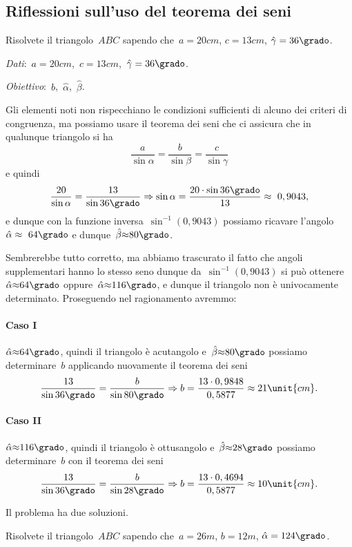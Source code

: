 \subsection{Riflessioni sull'uso del teorema dei seni}
\begin{problema}
Risolvete il triangolo~$ABC$ sapendo che~$a= 20\unit{cm}$, $c= 13\unit{cm}$, 
${\hat{\gamma}}=36\grado$.
\end{problema}

\emph{Dati}:~$a= 20\unit{cm}$,\quad~$c= 
13\unit{cm}$,\quad~${\hat{\gamma}}=36\grado$.

\emph{Obiettivo}:~$b$,\quad~$\hat{\alpha}$,\quad~$\hat{\beta}$.

Gli elementi noti non rispecchiano le condizioni sufficienti di alcuno dei 
criteri di congruenza, ma possiamo usare il teorema dei seni
che ci assicura che in qualunque triangolo si ha
 \[\frac{a}{\sin \alpha}=\frac{b}{\sin \beta}=\frac{c}{\sin \gamma}\]
e quindi
\[\frac{20}{\sin \alpha}=\frac{13}{\sin 36\grado}\Rightarrow\sin 
\alpha=\frac{20\cdot\sin 36\grado}{13}\approx~0,9043,\]
e dunque con la funzione inversa~$\sin^{-1}(0,9043)$ possiamo ricavare 
l'angolo~${\hat{\alpha}}\approx~64\grado$ e 
dunque~${\hat{\beta}}{\approx}80\grado$.

Sembrerebbe tutto corretto, ma abbiamo trascurato il fatto che angoli 
supplementari hanno lo stesso seno dunque
da~$\sin ^{-1}(0,9043)$ si può ottenere~${\hat{\alpha}}{\approx} 64\grado$ 
oppure~${\hat{\alpha}}{\approx}116\grado$,
e dunque il triangolo non è univocamente determinato. Proseguendo nel 
ragionamento avremmo:
\paragraph{Caso I}
${\hat{\alpha}}{\approx}64\grado$, quindi il triangolo è acutangolo 
e~${\hat{\beta}}{\approx} 80\grado$ possiamo determinare~$b$ applicando 
nuovamente
il teorema dei seni
\[\frac{13}{\sin 36\grado}=\frac{b}{\sin 80\grado}\Rightarrow 
b=\frac{13\cdot0,9848}{0,5877}\approx21\unit{cm}.\]
\paragraph{Caso II}
${\hat{\alpha}}{\approx}116\grado$, quindi il triangolo è ottusangolo 
e~${\hat{\beta}}{\approx} 28\grado$ possiamo determinare~$b$ con
il teorema dei seni
\[\frac{13}{\sin 36\grado}=\frac{b}{\sin 28\grado}\Rightarrow 
b=\frac{13\cdot0,4694}{0,5877}\approx10\unit{cm}.\]

Il problema ha due soluzioni.
\begin{problema}
Risolvete il triangolo~$ABC$ sapendo che~$a= 26\unit{m}$, $b= 12\unit{m}$, 
${\hat{\alpha}}=124\grado$.
\end{problema}

